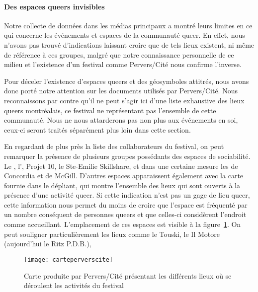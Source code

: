 \paragraph{Des espaces queers  invisibles}
Notre collecte de données dans les médias principaux a montré leurs limites en ce qui concerne les événements et espaces de la communauté queer.
En effet, nous n'avons pas trouvé d'indications laissant croire que de tels lieux existent, ni même de référence à ces groupes, malgré que notre connaissance personnelle de ce milieu et l'existence d'un festival comme Pervers/Cité nous confirme l'inverse.

Pour déceler l'existence d'espaces queers et des géosymboles attitrés, nous avons donc porté notre attention sur les documents utilisés par Pervers/Cité.
Nous reconnaissons par contre qu'il ne peut s'agir ici d'une liste exhaustive des lieux queers montréalais, ce festival ne représentant pas l'ensemble de cette communauté.
Nous ne nous attarderons pas non plus aux événements en soi, ceux-ci seront traités séparément plus loin dans cette section.

En regardant de plus près la liste des collaborateurs du festival, on peut remarquer la présence de plusieurs groupes possédants  des espaces de sociabilité.
Le \alccva{}, l'\astteq{}, Projet 10, le Ste-Emilie Skillshare, et dans une
certaine mesure les \grip{} de Concordia et de McGill.
D'autres espaces apparaissent également avec la carte fournie dans le dépliant, qui montre l'ensemble des lieux qui sont ouverts à la présence d'une activité queer.
Si cette indication n'est pas un gage de lieu queer, cette information nous permet du moins de croire que l'espace est fréquenté par un nombre conséquent de personnes queers et que celles-ci considèrent l'endroit comme accueillant.
L'emplacement de ces espaces est visible à la figure~\ref{fig:carteperverscite}.
On peut souligner particulièrement les lieux comme le Touski, le Il Motore (aujourd'hui le Ritz P.D.B.),

\begin{figure}[h]
  \centering
  \texttt{[image: carteperverscite]}
  \caption[Carte des activités de Pervers/Cité]{Carte produite par Pervers/Cité présentant les différents lieux où se déroulent les activités du festival}\label{fig:carteperverscite}
  \source{\agq{}}
\end{figure}


